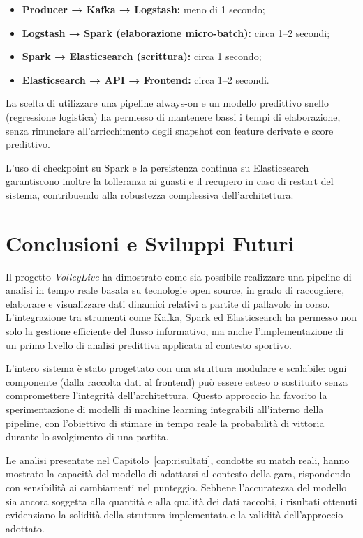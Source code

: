 \documentclass[a4paper,12pt]{report}
\begin{document}
\begin{itemize}
  \item \textbf{Producer → Kafka → Logstash:} meno di 1 secondo;
  \item \textbf{Logstash → Spark (elaborazione micro-batch):} circa 1--2 secondi;
  \item \textbf{Spark → Elasticsearch (scrittura):} circa 1 secondo;
  \item \textbf{Elasticsearch → API → Frontend:} circa 1--2 secondi.
\end{itemize}

La scelta di utilizzare una pipeline always-on e un modello predittivo snello (regressione logistica) ha permesso di mantenere bassi i tempi di elaborazione, senza rinunciare all’arricchimento degli snapshot con feature derivate e score predittivo.

L’uso di checkpoint su Spark e la persistenza continua su Elasticsearch garantiscono inoltre la tolleranza ai guasti e il recupero in caso di restart del sistema, contribuendo alla robustezza complessiva dell’architettura.



\chapter*{Conclusioni e Sviluppi Futuri}

Il progetto \textit{VolleyLive} ha dimostrato come sia possibile realizzare una pipeline di analisi in tempo reale basata su tecnologie open source, in grado di raccogliere, elaborare e visualizzare dati dinamici relativi a partite di pallavolo in corso. L’integrazione tra strumenti come Kafka, Spark ed Elasticsearch ha permesso non solo la gestione efficiente del flusso informativo, ma anche l’implementazione di un primo livello di analisi predittiva applicata al contesto sportivo.

L’intero sistema è stato progettato con una struttura modulare e scalabile: ogni componente (dalla raccolta dati al frontend) può essere esteso o sostituito senza compromettere l’integrità dell’architettura. Questo approccio ha favorito la sperimentazione di modelli di machine learning integrabili all’interno della pipeline, con l’obiettivo di stimare in tempo reale la probabilità di vittoria durante lo svolgimento di una partita.

Le analisi presentate nel Capitolo~\ref{cap:risultati}, condotte su match reali, hanno mostrato la capacità del modello di adattarsi al contesto della gara, rispondendo con sensibilità ai cambiamenti nel punteggio. Sebbene l’accuratezza del modello sia ancora soggetta alla quantità e alla qualità dei dati raccolti, i risultati ottenuti evidenziano la solidità della struttura implementata e la validità dell’approccio adottato.
\end{document}
